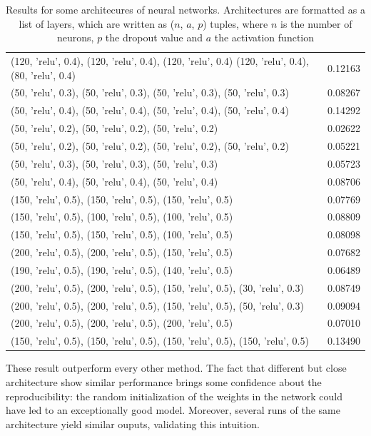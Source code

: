 \begin{table}[h!]
\begin{tabular}{|p{}|p{}|}
        (120, 'relu', 0.4), (120, 'relu', 0.4), (120, 'relu', 0.4) (120, 'relu', 0.4), (80, 'relu', 0.4) & 0.12163 \\
        (50, 'relu', 0.3), (50, 'relu', 0.3), (50, 'relu', 0.3), (50, 'relu', 0.3) & 0.08267 \\
        (50, 'relu', 0.4), (50, 'relu', 0.4), (50, 'relu', 0.4), (50, 'relu', 0.4) & 0.14292 \\
        (50, 'relu', 0.2), (50, 'relu', 0.2), (50, 'relu', 0.2) & 0.02622 \\
        (50, 'relu', 0.2), (50, 'relu', 0.2), (50, 'relu', 0.2), (50, 'relu', 0.2) & 0.05221 \\
        (50, 'relu', 0.3), (50, 'relu', 0.3), (50, 'relu', 0.3) & 0.05723 \\
        (50, 'relu', 0.4), (50, 'relu', 0.4), (50, 'relu', 0.4) & 0.08706 \\
        (150, 'relu', 0.5), (150, 'relu', 0.5), (150, 'relu', 0.5) & 0.07769 \\
        (150, 'relu', 0.5), (100, 'relu', 0.5), (100, 'relu', 0.5) & 0.08809 \\
        (150, 'relu', 0.5), (150, 'relu', 0.5), (100, 'relu', 0.5) & 0.08098 \\
        (200, 'relu', 0.5), (200, 'relu', 0.5), (150, 'relu', 0.5) & 0.07682 \\
        (190, 'relu', 0.5), (190, 'relu', 0.5), (140, 'relu', 0.5) & 0.06489 \\
        (200, 'relu', 0.5), (200, 'relu', 0.5), (150, 'relu', 0.5), (30, 'relu', 0.3) & 0.08749 \\
        (200, 'relu', 0.5), (200, 'relu', 0.5), (150, 'relu', 0.5), (50, 'relu', 0.3) & 0.09094 \\
        (200, 'relu', 0.5), (200, 'relu', 0.5), (200, 'relu', 0.5) & 0.07010 \\
        (150, 'relu', 0.5), (150, 'relu', 0.5), (150, 'relu', 0.5), (150, 'relu', 0.5) & 0.13490 \\ \hline
    \end{tabular}
    \caption{Results for some architecures of neural networks. Architectures are formatted as a list of layers, which are written as ($n$, $a$, $p$) tuples, where $n$ is the number of neurons, $p$ the dropout value and $a$ the activation function}
    \label{tab:nn-results}
\end{table}

These result outperform every other method. The fact that different but close architecture show similar performance brings some confidence about the reproducibility: the random initialization of the weights in the network could have led to an exceptionally good model. Moreover, several runs of the same architecture yield similar ouputs, validating this intuition.

